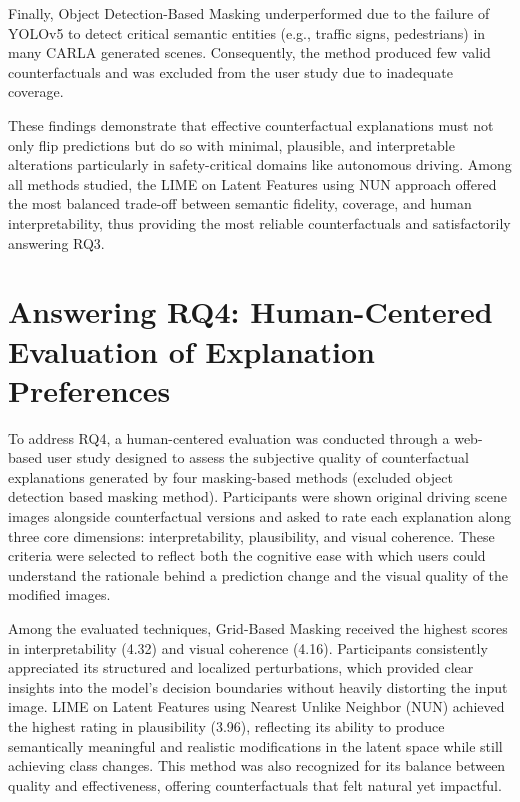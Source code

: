 Finally, Object Detection-Based Masking underperformed due to the failure of YOLOv5 to detect critical semantic entities (e.g., traffic signs, pedestrians) in many CARLA generated scenes. Consequently, the method produced few valid counterfactuals and was excluded from the user study due to inadequate coverage.

These findings demonstrate that effective counterfactual explanations must not only flip predictions but do so with minimal, plausible, and interpretable alterations particularly in safety-critical domains like autonomous driving. Among all methods studied, the LIME on Latent Features using NUN approach offered the most balanced trade-off between semantic fidelity, coverage, and human interpretability, thus providing the most reliable counterfactuals and satisfactorily answering RQ3.

\section{Answering RQ4: Human-Centered Evaluation of Explanation Preferences}

To address RQ4, a human-centered evaluation was conducted through a web-based user study designed to assess the subjective quality of counterfactual explanations generated by four masking-based methods (excluded object detection based masking method). Participants were shown original driving scene images alongside counterfactual versions and asked to rate each explanation along three core dimensions: interpretability, plausibility, and visual coherence. These criteria were selected to reflect both the cognitive ease with which users could understand the rationale behind a prediction change and the visual quality of the modified images.

Among the evaluated techniques, Grid-Based Masking received the highest scores in interpretability (4.32) and visual coherence (4.16). Participants consistently appreciated its structured and localized perturbations, which provided clear insights into the model’s decision boundaries without heavily distorting the input image. LIME on Latent Features using Nearest Unlike Neighbor (NUN) achieved the highest rating in plausibility (3.96), reflecting its ability to produce semantically meaningful and realistic modifications in the latent space while still achieving class changes. This method was also recognized for its balance between quality and effectiveness, offering counterfactuals that felt natural yet impactful.

